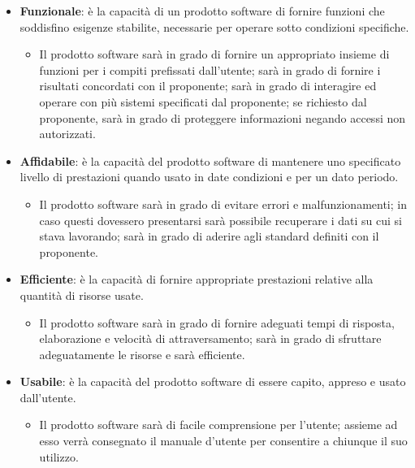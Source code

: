 \documentclass[../piano_di_qualifica.tex]{subfiles}
\begin{document}
\begin{itemize}
	\item \textbf{Funzionale}: è la capacità di un prodotto software di fornire funzioni che soddisfino esigenze stabilite, necessarie per operare sotto condizioni specifiche.
	      \begin{itemize}
		      \item Il prodotto software sarà in grado di fornire un appropriato insieme di funzioni per i compiti prefissati dall’utente; sarà in grado di fornire i risultati concordati con il proponente; sarà in grado di interagire ed operare con più sistemi specificati dal proponente; se richiesto dal proponente, sarà in grado di proteggere informazioni negando accessi non autorizzati.
	      \end{itemize}

	\item \textbf{Affidabile}: è la capacità del prodotto software di mantenere uno specificato livello di prestazioni quando usato in date condizioni e per un dato periodo.
	      \begin{itemize}
		      \item Il prodotto software sarà in grado di evitare errori e malfunzionamenti; in caso questi dovessero presentarsi sarà possibile recuperare i dati su cui si stava lavorando; sarà in grado di aderire agli standard definiti con il proponente.
	      \end{itemize}

	\item \textbf{Efficiente}: è la capacità di fornire appropriate prestazioni relative alla quantità di risorse usate.
	      \begin{itemize}
		      \item Il prodotto software sarà in grado di fornire adeguati tempi di risposta, elaborazione e velocità di attraversamento; sarà in grado di sfruttare adeguatamente le risorse e sarà efficiente.
	      \end{itemize}

	\item \textbf{Usabile}: è la capacità del prodotto software di essere capito, appreso e usato dall'utente.
	      \begin{itemize}
		      \item Il prodotto software sarà di facile comprensione per l’utente; assieme ad esso verrà consegnato il manuale d’utente per consentire a chiunque il suo utilizzo.
	      \end{itemize}


\end{itemize}
\end{document}
